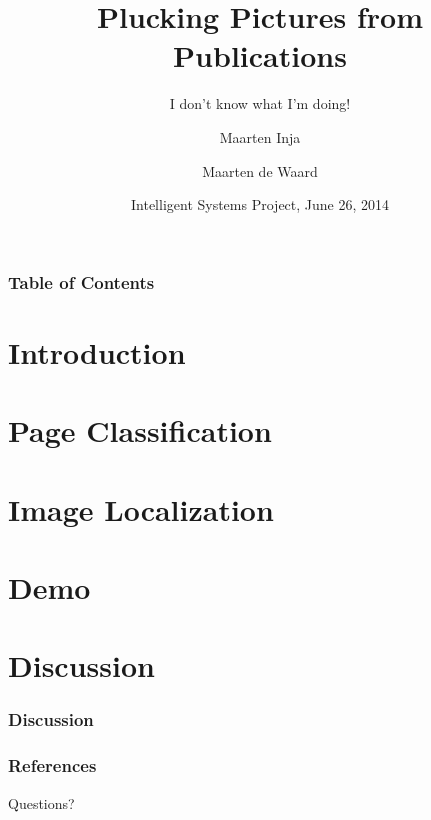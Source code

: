 \documentclass{beamer}
\title{Plucking Pictures from Publications}
\subtitle{I don't know what I'm doing!}
\author{Maarten Inja \and Maarten de Waard}
\institute[UvA]{University of Amsterdam}
\date[2014]{Intelligent Systems Project, June 26, 2014}
\newcommand{\slide}[2]
{
\begin{frame}
\frametitle{#1} 

#2

\end{frame}
}
\begin{document}
\begin{frame}
\titlepage
\end{frame}

\slide{Table of Contents}
{
	\tableofcontents
}

\section{Introduction}


\section{Page Classification}


\section{Image Localization}




\section{Demo}


\section{Discussion}

\slide{Discussion}
{}
\begin{frame}[allowframebreaks]
        \frametitle{References}
        
        
\end{frame}

\begin{frame}
Questions?
\end{frame}
\end{document}
